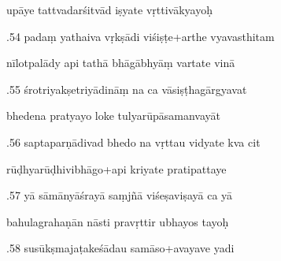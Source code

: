 \documentclass[article,12pt,a4paper]{memoir}%
\newcounter{parCount}
\begin{document}
	  
	  \pstart \leavevmode%
	upāye tattvadarśitvād iṣyate vṛttivākyayoḥ 
	{}
	\pend%
      

	  
	  \pstart {}.54 padaṃ yathaiva vṛkṣādi viśiṣṭe+arthe vyavasthitam 
	{}
	\pend%
      

	  
	  \pstart \leavevmode%
	nīlotpalādy api tathā bhāgābhyāṃ vartate vinā 
	{}
	\pend%
      

	  
	  \pstart {}.55 śrotriyakṣetriyādināṃ na ca vāsiṣṭhagārgyavat 
	{}
	\pend%
      

	  
	  \pstart \leavevmode%
	bhedena pratyayo loke tulyarūpāsamanvayāt 
	{}
	\pend%
      

	  
	  \pstart {}.56 saptaparṇādivad bhedo na vṛttau vidyate kva cit 
	{}
	\pend%
      

	  
	  \pstart \leavevmode%
	rūḍhyarūḍhivibhāgo+api kriyate pratipattaye 
	{}
	\pend%
      

	  
	  \pstart {}.57 yā sāmānyāśrayā saṃjñā viśeṣaviṣayā ca yā 
	{}
	\pend%
      

	  
	  \pstart \leavevmode%
	bahulagrahaṇān nāsti pravṛttir ubhayos tayoḥ 
	{}
	\pend%
      

	  
	  \pstart {}.58 susūkṣmajaṭakeśādau samāso+avayave yadi 
	{}
	\pend%
      
\end{document}
